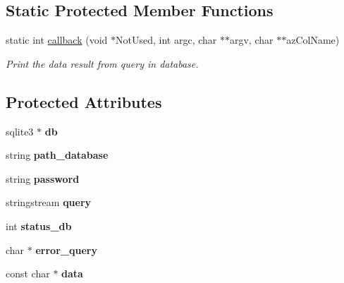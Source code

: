 \subsection*{Static Protected Member Functions}
\begin{DoxyCompactItemize}
\item 
static int \hyperlink{classSQLite_a2cdec2824226fb74b9c5f53fb2eb9c52}{callback} (void $\ast$Not\-Used, int argc, char $\ast$$\ast$argv, char $\ast$$\ast$az\-Col\-Name)
\begin{DoxyCompactList}\small\item\em Print the data result from query in database. \end{DoxyCompactList}\end{DoxyCompactItemize}
\subsection*{Protected Attributes}
\begin{DoxyCompactItemize}
\item 
\hypertarget{classSQLite_a1d24b48aa333500d31dd1741c474ee77}{sqlite3 $\ast$ {\bfseries db}}\label{classSQLite_a1d24b48aa333500d31dd1741c474ee77}

\item 
\hypertarget{classSQLite_a35c90bc05faa587c66031661a365db20}{string {\bfseries path\-\_\-database}}\label{classSQLite_a35c90bc05faa587c66031661a365db20}

\item 
\hypertarget{classSQLite_a5db7ea6ca4da520fb5125631b081acb9}{string {\bfseries password}}\label{classSQLite_a5db7ea6ca4da520fb5125631b081acb9}

\item 
\hypertarget{classSQLite_a524b7fb749c55eae9076981de81f6576}{stringstream {\bfseries query}}\label{classSQLite_a524b7fb749c55eae9076981de81f6576}

\item 
\hypertarget{classSQLite_ab54d46b70b16ac3d91631c926d633d42}{int {\bfseries status\-\_\-db}}\label{classSQLite_ab54d46b70b16ac3d91631c926d633d42}

\item 
\hypertarget{classSQLite_a641bc6c63769eee5ab03dfd0cd26f0bc}{char $\ast$ {\bfseries error\-\_\-query}}\label{classSQLite_a641bc6c63769eee5ab03dfd0cd26f0bc}

\item 
\hypertarget{classSQLite_a7c608c690c08fce28810d549ab488074}{const char $\ast$ {\bfseries data}}\label{classSQLite_a7c608c690c08fce28810d549ab488074}

\end{DoxyCompactItemize}


